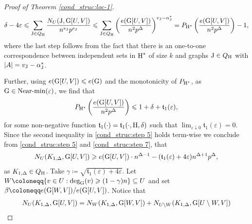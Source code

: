 \documentclass[a4paper,11pt,english,reqno]{amsart}
\numberwithin{equation}{section}
\renewcommand{\leq}{\leqslant}
\renewcommand{\geq}{\geqslant}
\newcommand{\uH}{\textup{H}}
\renewcommand{\P}{\mathbb{P}}
\newcommand{\tu}[1]{\textup{#1}}
\newcommand{\set}[1]{[\![#1]\!]}
\begin{document}
\begin{proof}[Proof of Theorem \ref{cond_struc:loc-1}]
				\begin{equation}
					\label{cond_struc:step 5}
					\delta - 4\varepsilon \leq \sum_{\tu{J}\in Q_{\uH}} \frac{N_{U}(\tu{J}, \tu{G}[U,V])} {n^{v_{\tu{J}}}p^{e_{\tu{J}}}}\leq\sum_{\tu{J}\in Q_{\uH}} \left(\frac{e(\tu{G}[U,V])}{n^{2}p^{\Delta}} \right)^{v_{\tu{J}}-\alpha_{\tu{J}}^{*}} = P_{\uH^{*}}\left(\frac{e(\tu{G}[U,V])}{n^{2}p^{\Delta}} \right)-1,
				\end{equation}
				where the last step follows from the fact that there is an one-to-one correspondence between independent sets in $\uH^*$ of size $k$ and graphs $\tu{J} \in Q_\uH$ with $|A|= v_{\tu{J}} - \alpha^*_{\tu{J}}$.
				
				Further, using $e(\tu{G}[U,V])\leq e(\tu{G})$ and the monotonicity of $P_{\uH^{*}}$, as $\tu{G} \in \tu{Near-min}(\varepsilon)$, we find that %
				\begin{equation}
					\label{cond_struc:step 7}
					P_{\uH^{*}}\left(\frac{e(\tu{G}[U,V])}{n^{2}p^{\Delta}} \right)%
					\leq  1+\delta+\mathfrak{t}_{1}(\varepsilon), 
				\end{equation}
				for some non-negative function $\mathfrak{t}_{1}(\cdot) = \mathfrak{t}_1(\cdot, \uH, \delta)$ such that $\lim_{\varepsilon\downarrow 0} \mathfrak{t}_{1}(\varepsilon)=0$. Since the second inequality in \eqref{cond_struc:step 5} holds term-wise we conclude from \eqref{cond_struc:step 5} and \eqref{cond_struc:step 7}, that 
				\begin{equation} 
					\label{cond_struc:step 8}
					N_{U}(K_{1, \Delta}, \tu{G}[U,V])\geq e(\tu{G}[U,V])\cdot n^{\Delta-1} - (\mathfrak{t}_{1}(\varepsilon)+4\varepsilon) n^{\Delta+1}p^{\Delta},
				\end{equation} 
				as $K_{1,\Delta}\in Q_{\uH}$. Take $\gamma \coloneqq \sqrt{\mathfrak{t}_{1}(\varepsilon)+4\varepsilon}$. Let $W\coloneqq \{v\in U: \tu{deg}_{\tu{G}}(v)\geq (1-\gamma)n\}\subseteq U$ and set $\beta \coloneqq e(\tu{G}[W,V])/ e(\tu{G}[U,V])$. Notice that
				\begin{equation}
					\label{cond_struc:step 9}
					\begin{aligned}
						&N_{U}(K_{1,\Delta}, \tu{G}[U,V]) = N_{W}(K_{1,\Delta}, \tu{G}[W,V]) + N_{U\setminus W}(K_{1,\Delta}, \tu{G}[U\setminus W,V]) \\

\end{aligned}
\end{equation}
\end{proof}
\end{document}
